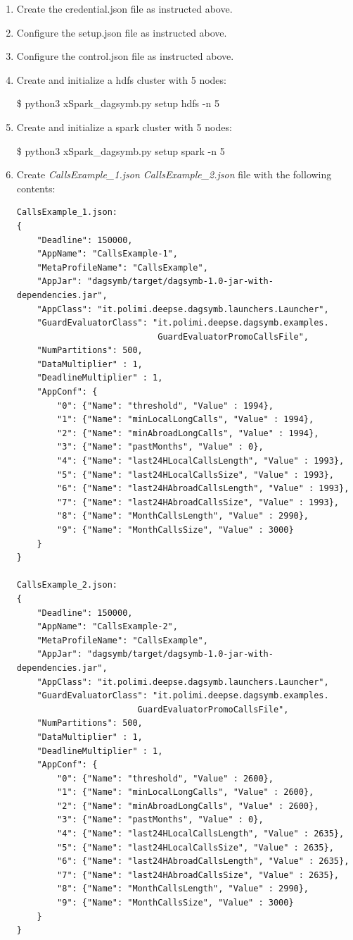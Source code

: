 \begin{enumerate}
\def\labelenumi{\arabic{enumi})}
\item
Create the credential.json file as instructed above.
\item
Configure the setup.json file as instructed above.
\item
Configure the control.json file as instructed above.
\item
Create and initialize a hdfs cluster with 5 nodes:

\$ python3 xSpark\_dagsymb.py setup hdfs -n 5
\item
Create and initialize a spark cluster with 5 nodes:

\$ python3 xSpark\_dagsymb.py setup spark -n 5
\item
Create \emph{CallsExample\_1.json CallsExample\_2.json} file with the following contents:
\begin{verbatim}
CallsExample_1.json:
{
    "Deadline": 150000,
    "AppName": "CallsExample-1",
    "MetaProfileName": "CallsExample",
    "AppJar": "dagsymb/target/dagsymb-1.0-jar-with-dependencies.jar",
    "AppClass": "it.polimi.deepse.dagsymb.launchers.Launcher",
    "GuardEvaluatorClass": "it.polimi.deepse.dagsymb.examples.
                            GuardEvaluatorPromoCallsFile",
    "NumPartitions": 500,
    "DataMultiplier" : 1,
    "DeadlineMultiplier" : 1,
    "AppConf": {
        "0": {"Name": "threshold", "Value" : 1994},
        "1": {"Name": "minLocalLongCalls", "Value" : 1994},
        "2": {"Name": "minAbroadLongCalls", "Value" : 1994},
        "3": {"Name": "pastMonths", "Value" : 0},
        "4": {"Name": "last24HLocalCallsLength", "Value" : 1993},
        "5": {"Name": "last24HLocalCallsSize", "Value" : 1993},
        "6": {"Name": "last24HAbroadCallsLength", "Value" : 1993},
        "7": {"Name": "last24HAbroadCallsSize", "Value" : 1993},
        "8": {"Name": "MonthCallsLength", "Value" : 2990},
        "9": {"Name": "MonthCallsSize", "Value" : 3000}
    }
}

CallsExample_2.json:
{
    "Deadline": 150000,
    "AppName": "CallsExample-2",
    "MetaProfileName": "CallsExample",
    "AppJar": "dagsymb/target/dagsymb-1.0-jar-with-dependencies.jar",
    "AppClass": "it.polimi.deepse.dagsymb.launchers.Launcher",
    "GuardEvaluatorClass": "it.polimi.deepse.dagsymb.examples.
                        GuardEvaluatorPromoCallsFile",
    "NumPartitions": 500,
    "DataMultiplier" : 1,
    "DeadlineMultiplier" : 1,
    "AppConf": {
        "0": {"Name": "threshold", "Value" : 2600},
        "1": {"Name": "minLocalLongCalls", "Value" : 2600},
        "2": {"Name": "minAbroadLongCalls", "Value" : 2600},
        "3": {"Name": "pastMonths", "Value" : 0},
        "4": {"Name": "last24HLocalCallsLength", "Value" : 2635},
        "5": {"Name": "last24HLocalCallsSize", "Value" : 2635},
        "6": {"Name": "last24HAbroadCallsLength", "Value" : 2635},
        "7": {"Name": "last24HAbroadCallsSize", "Value" : 2635},
        "8": {"Name": "MonthCallsLength", "Value" : 2990},
        "9": {"Name": "MonthCallsSize", "Value" : 3000}
    }
}
\end{verbatim}


\end{enumerate}
